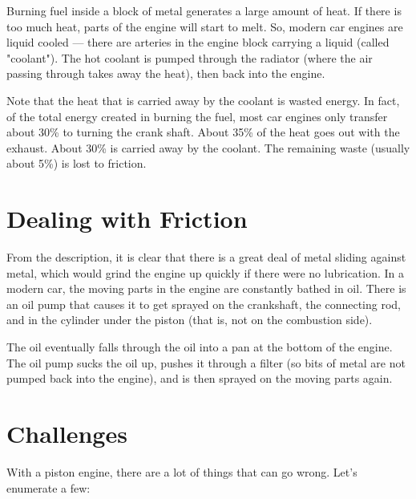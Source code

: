 Burning fuel inside a block of metal generates a large amount of heat.  If there is too much heat,  parts of the engine will start to melt.  So, modern car engines are liquid cooled --- there are arteries in the engine block carrying a liquid (called "coolant").  The hot coolant is pumped through the radiator (where the air passing through takes away the heat), then back into the engine.

Note that the heat that is carried away by the coolant is wasted energy.    In fact,  of the total energy created in burning the fuel,  most car engines only transfer about 30\% to turning the crank shaft.  About 35\% of the heat goes out with the exhaust.  About 30\% is carried away by the coolant.  
The remaining waste (usually about  5\%) is lost to friction.

\section{Dealing with Friction}

From the description,  it is clear that there is a great deal of metal sliding against metal,  which would grind the engine up quickly if there were no lubrication.  In a modern car, the moving parts in the engine are constantly bathed in oil.  There is an oil pump that causes it to get sprayed on the crankshaft, the connecting rod, and in the cylinder under the piston (that is, not on the combustion side).  

The oil eventually falls through the oil into a pan at the bottom of the engine.   The oil pump sucks the oil up,  pushes it through a filter (so bits of metal are not pumped back into the engine),  and is then sprayed on the moving parts again.

\section{Challenges}

With a piston engine, there are a lot of things that can go wrong.  Let's enumerate a few:


